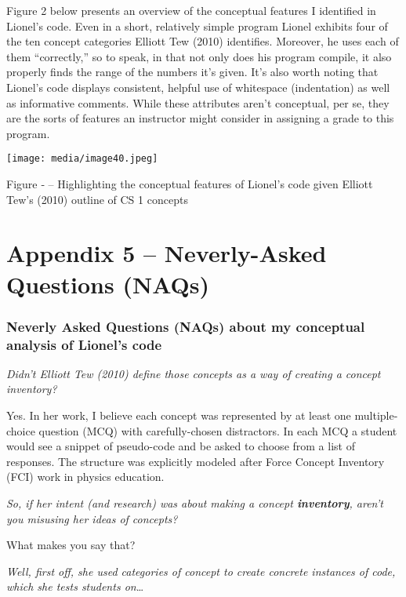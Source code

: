 Figure 2 below presents an overview of the conceptual features I
identified in Lionel's code. Even in a short, relatively simple program
Lionel exhibits four of the ten concept categories Elliott Tew (2010)
identifies. Moreover, he uses each of them ``correctly,'' so to speak,
in that not only does his program compile, it also properly finds the
range of the numbers it's given. It's also worth noting that Lionel's
code displays consistent, helpful use of whitespace (indentation) as
well as informative comments. While these attributes aren't conceptual,
per se, they are the sorts of features an instructor might consider in
assigning a grade to this program.

\texttt{[image: media/image40.jpeg]}

\protect\hypertarget{ux5fToc252445975}{}{}Figure ‑ -- Highlighting the
conceptual features of Lionel's code given Elliott Tew's (2010) outline
of CS 1 concepts

\section{Appendix 5 -- Neverly-Asked Questions
(NAQs)}\label{appendix-5-neverly-asked-questions-naqs}

\subsubsection{Neverly Asked Questions (NAQs) about my conceptual
analysis of Lionel's
code}\label{neverly-asked-questions-naqs-about-my-conceptual-analysis-of-lionels-code}

\emph{Didn't Elliott Tew (2010) define those concepts as a way of
creating a concept inventory?}

Yes. In her work, I believe each concept was represented by at least one
multiple-choice question (MCQ) with carefully-chosen distractors. In
each MCQ a student would see a snippet of pseudo-code and be asked to
choose from a list of responses. The structure was explicitly modeled
after Force Concept Inventory (FCI) work in physics education.

\emph{So, if her intent (and research) was about making a concept
\textbf{inventory}, aren't you misusing her ideas of concepts?}

What makes you say that?

\emph{Well, first off, she used categories of concept to create concrete
instances of code, which she tests students on}\ldots{}

